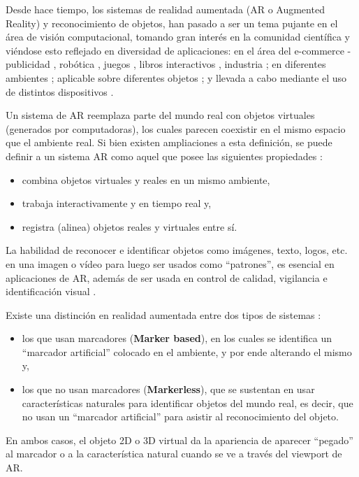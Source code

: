 \documentclass[a4paper,11pt,spanish]{article}
\begin{document}
Desde hace tiempo, los sistemas de realidad aumentada (AR o Augmented Reality) y reconocimiento de objetos,
han pasado a ser un tema pujante en el área de visión computacional, tomando gran 
interés en la comunidad científica y viéndose esto reflejado en diversidad de aplicaciones:
en el área del e-commerce - publicidad  \cite{5478308}, robótica \cite{Chen_markerlessaugmented, conf/icra/2010}, juegos \cite{5711053,Azuma:2001:RAA:616073.618862}, libros interactivos \cite{KimPW09},
industria \cite{conf/visapp/BenhimaneNGGNM08}; en diferentes ambientes \cite{conf/ismar/KleinM07, Chen_markerlessaugmented, Takacs:2008:OAR:1460096.1460165, conf/ismar/MiyashitaMTOESGGAL08}; aplicable sobre diferentes objetos 
\cite{conf/ismar/2007, Lepetit:2005:MMT:1166405.1166406, conf/iswc/2007}; y llevada a cabo mediante el uso de distintos dispositivos \cite{WagnerRMDS10}.

Un sistema de AR reemplaza parte del mundo real con objetos virtuales (generados por computadoras), los cuales parecen coexistir en el mismo espacio que el ambiente real. 
Si bien existen ampliaciones a esta definición, se puede definir a un sistema AR como aquel que posee las siguientes propiedades \cite{Azuma:2001:RAA:616073.618862}:
\begin{itemize}
 \item combina objetos virtuales y reales en un mismo ambiente,
 \item trabaja interactivamente y en tiempo real y,
 \item registra (alinea) objetos reales y virtuales entre sí.
\end{itemize}

La habilidad de reconocer e identificar objetos como imágenes, texto, logos, etc. en una imagen o vídeo para luego ser usados como ``patrones'', es esencial en 
aplicaciones de AR, además de ser usada en control de calidad, vigilancia e identificación visual \cite{5739718}.

Existe una distinción en realidad aumentada entre dos tipos de sistemas \cite{1320421}: 
\begin{itemize}
 \item los que usan marcadores (\textbf{Marker based}), en los cuales se identifica un ``marcador artificial'' colocado en el ambiente, y por ende alterando el mismo y,
 \item los que no usan marcadores (\textbf{Markerless}), que se sustentan en usar características naturales para identificar objetos del mundo real, es decir, que no usan un ``marcador artificial'' para asistir al reconocimiento del objeto.
\end{itemize}
En ambos casos, el objeto 2D o 3D virtual da la apariencia de aparecer ``pegado'' al marcador o a la característica natural cuando se ve a través del viewport de AR.
\end{document}
